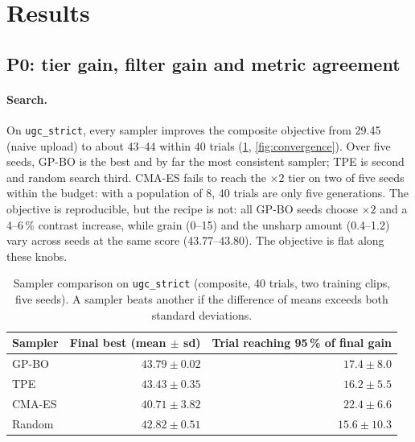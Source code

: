 \section{Results}
\label{sec:results}

\subsection{P0: tier gain, filter gain and metric agreement}
\label{sec:results-p0}

\paragraph{Search.}
On \texttt{ugc\_strict}, every sampler improves the composite objective from 29.45 (naive upload)
to about 43--44 within 40 trials (\cref{tab:samplers}, \cref{fig:convergence}). Over five seeds,
GP-BO is the best and by far the most consistent sampler; TPE is second and random search third.
CMA-ES fails to reach the $\times2$ tier on two of five seeds within the budget: with a population
of 8, 40 trials are only five generations. The objective is reproducible, but the recipe is not:
all GP-BO seeds choose $\times2$ and a 4--6\,\% contrast increase, while grain (0--15) and the
unsharp amount (0.4--1.2) vary across seeds at the same score (43.77--43.80). The objective is flat
along these knobs.

\begin{table}[t]
  \centering
  \caption{Sampler comparison on \texttt{ugc\_strict} (composite, 40 trials, two training clips,
  five seeds). A sampler beats another if the difference of means exceeds both standard deviations.}
  \label{tab:samplers}
  \begin{tabular}{@{}lrr@{}}
    \toprule
    Sampler & Final best (mean $\pm$ sd) & Trial reaching 95\,\% of final gain \\
    \midrule
    GP-BO  & $\mathbf{43.79 \pm 0.02}$ & $17.4 \pm 8.0$ \\
    TPE    & $43.43 \pm 0.35$ & $16.2 \pm 5.5$ \\
    CMA-ES & $40.71 \pm 3.82$ & $22.4 \pm 6.6$ \\
    Random & $42.82 \pm 0.51$ & $15.6 \pm 10.3$ \\
    \bottomrule
  \end{tabular}
\end{table}

